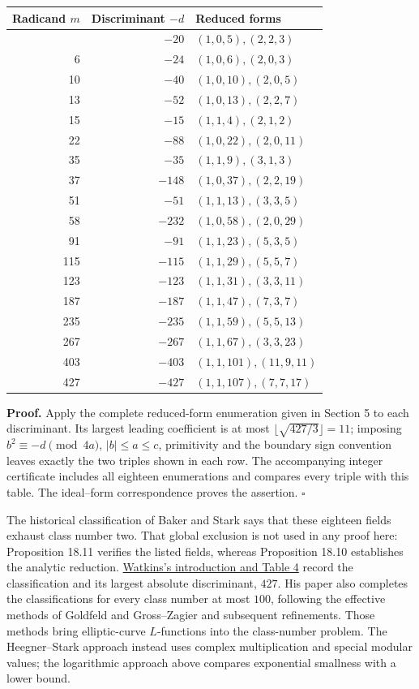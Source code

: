 \documentclass[
  11pt,
  a4paper,
]{article}
\newcounter{none} %
\begin{document}
{\def\LTcaptype{none} %
\begin{longtable}[]{@{}rrl@{}}
\toprule\noalign{}
Radicand \(m\) & Discriminant \(-d\) & Reduced forms \\
\midrule\noalign{}
\endhead
\bottomrule\noalign{}
\endlastfoot
5 & \(-20\) & \((1,0,5),(2,2,3)\) \\
6 & \(-24\) & \((1,0,6),(2,0,3)\) \\
10 & \(-40\) & \((1,0,10),(2,0,5)\) \\
13 & \(-52\) & \((1,0,13),(2,2,7)\) \\
15 & \(-15\) & \((1,1,4),(2,1,2)\) \\
22 & \(-88\) & \((1,0,22),(2,0,11)\) \\
35 & \(-35\) & \((1,1,9),(3,1,3)\) \\
37 & \(-148\) & \((1,0,37),(2,2,19)\) \\
51 & \(-51\) & \((1,1,13),(3,3,5)\) \\
58 & \(-232\) & \((1,0,58),(2,0,29)\) \\
91 & \(-91\) & \((1,1,23),(5,3,5)\) \\
115 & \(-115\) & \((1,1,29),(5,5,7)\) \\
123 & \(-123\) & \((1,1,31),(3,3,11)\) \\
187 & \(-187\) & \((1,1,47),(7,3,7)\) \\
235 & \(-235\) & \((1,1,59),(5,5,13)\) \\
267 & \(-267\) & \((1,1,67),(3,3,23)\) \\
403 & \(-403\) & \((1,1,101),(11,9,11)\) \\
427 & \(-427\) & \((1,1,107),(7,7,17)\) \\
\end{longtable}
}

\textbf{Proof.} Apply the complete reduced-form enumeration given in
Section 5 to each discriminant. Its largest leading coefficient is at
most \(\lfloor\sqrt{427/3}\rfloor=11\); imposing
\(b^2\equiv-d\pmod{4a}\), \(|b|\le a\le c\), primitivity and the
boundary sign convention leaves exactly the two triples shown in each
row. The accompanying integer certificate includes all eighteen
enumerations and compares every triple with this table. The ideal--form
correspondence proves the assertion. \(\square\)

The historical classification of Baker and Stark says that these
eighteen fields exhaust class number two. That global exclusion is not
used in any proof here: Proposition 18.11 verifies the listed fields,
whereas Proposition 18.10 establishes the analytic reduction.
\href{https://magma.maths.usyd.edu.au/~watkins/papers/smallcn.pdf}{Watkins's
introduction and Table 4} record the classification and its largest
absolute discriminant, \(427\). His paper also completes the
classifications for every class number at most \(100\), following the
effective methods of Goldfeld and Gross--Zagier and subsequent
refinements. Those methods bring elliptic-curve \(L\)-functions into the
class-number problem. The Heegner--Stark approach instead uses complex
multiplication and special modular values; the logarithmic approach
above compares exponential smallness with a lower bound.
\end{document}
